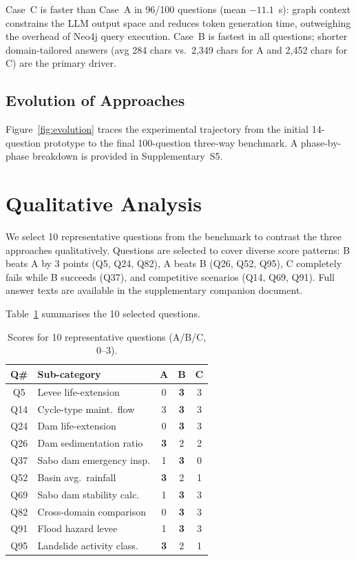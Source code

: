 \documentclass[twocolumn]{article}
\begin{document}
Case~C is faster than Case~A in 96/100 questions (mean $-11.1$~s):
graph context constrains the LLM output space and reduces token generation time,
outweighing the overhead of Neo4j query execution.
Case~B is fastest in all questions; shorter domain-tailored answers (avg 284 chars vs.\
2,349 chars for A and 2,452 chars for C) are the primary driver.

\subsection{Evolution of Approaches}

Figure~\ref{fig:evolution} traces the experimental trajectory from the initial 14-question
prototype to the final 100-question three-way benchmark.
A phase-by-phase breakdown is provided in Supplementary~S5.

\section{Qualitative Analysis}
\label{sec:qualitative}

We select 10 representative questions from the benchmark to contrast the three approaches
qualitatively.
Questions are selected to cover diverse score patterns:
B beats A by 3 points (Q5, Q24, Q82), A beats B (Q26, Q52, Q95),
C completely fails while B succeeds (Q37), and competitive scenarios (Q14, Q69, Q91).
Full answer texts are available in the supplementary companion document.

Table~\ref{tab:qualitative} summarises the 10 selected questions.

\begin{table}[H]
  \centering
  \caption{Scores for 10 representative questions (A/B/C, 0--3).}
  \label{tab:qualitative}
  \begin{tabular}{clccc}
    \toprule
    Q\# & Sub-category & A & B & C \\
    \midrule
    Q5  & Levee life-extension       & 0 & \textbf{3} & 3 \\
    Q14 & Cycle-type maint.\ flow   & 3 & \textbf{3} & 3 \\
    Q24 & Dam life-extension        & 0 & \textbf{3} & 3 \\
    Q26 & Dam sedimentation ratio   & \textbf{3} & 2 & 2 \\
    Q37 & Sabo dam emergency insp.  & 1 & \textbf{3} & 0 \\
    Q52 & Basin avg.\ rainfall      & \textbf{3} & 2 & 1 \\
    Q69 & Sabo dam stability calc.  & 1 & \textbf{3} & 3 \\
    Q82 & Cross-domain comparison   & 0 & \textbf{3} & 3 \\
    Q91 & Flood hazard levee        & 1 & \textbf{3} & 3 \\
    Q95 & Landslide activity class. & \textbf{3} & 2 & 1 \\
    \bottomrule
  \end{tabular}
\end{table}
\end{document}
